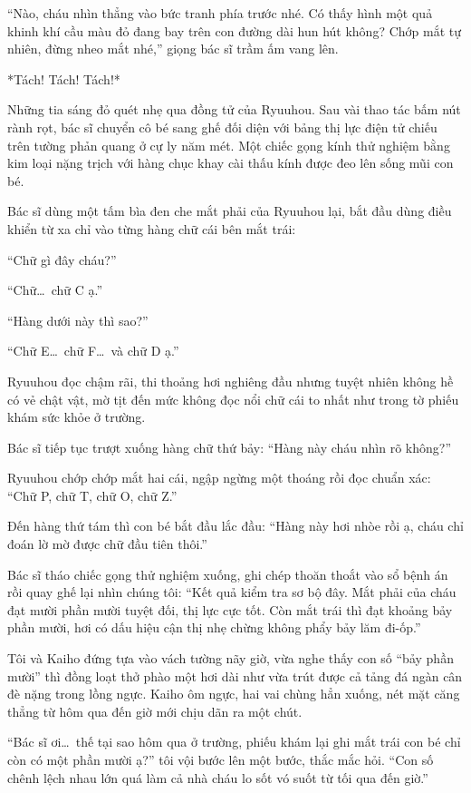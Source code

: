 ﻿\documentclass[../main.tex]{subfiles}
\begin{document}
``Nào, cháu nhìn thẳng vào bức tranh phía trước nhé. Có thấy hình một quả khinh khí cầu màu đỏ đang bay trên con đường dài hun hút không? Chớp mắt tự nhiên, đừng nheo mắt nhé,'' giọng bác sĩ trầm ấm vang lên.

*Tách! Tách! Tách!*

Những tia sáng đỏ quét nhẹ qua đồng tử của Ryuuhou. Sau vài thao tác bấm nút rành rọt, bác sĩ chuyển cô bé sang ghế đối diện với bảng thị lực điện tử chiếu trên tường phản quang ở cự ly năm mét. Một chiếc gọng kính thử nghiệm bằng kim loại nặng trịch với hàng chục khay cài thấu kính được đeo lên sống mũi con bé.

Bác sĩ dùng một tấm bìa đen che mắt phải của Ryuuhou lại, bắt đầu dùng điều khiển từ xa chỉ vào từng hàng chữ cái bên mắt trái:

``Chữ gì đây cháu?''

``Chữ\dots\ chữ C ạ.''

``Hàng dưới này thì sao?''

``Chữ E\dots\ chữ F\dots\ và chữ D ạ.''

Ryuuhou đọc chậm rãi, thi thoảng hơi nghiêng đầu nhưng tuyệt nhiên không hề có vẻ chật vật, mờ tịt đến mức không đọc nổi chữ cái to nhất như trong tờ phiếu khám sức khỏe ở trường.

Bác sĩ tiếp tục trượt xuống hàng chữ thứ bảy: ``Hàng này cháu nhìn rõ không?''

Ryuuhou chớp chớp mắt hai cái, ngập ngừng một thoáng rồi đọc chuẩn xác: ``Chữ P, chữ T, chữ O, chữ Z.''

Đến hàng thứ tám thì con bé bắt đầu lắc đầu: ``Hàng này hơi nhòe rồi ạ, cháu chỉ đoán lờ mờ được chữ đầu tiên thôi.''

Bác sĩ tháo chiếc gọng thử nghiệm xuống, ghi chép thoăn thoắt vào sổ bệnh án rồi quay ghế lại nhìn chúng tôi: ``Kết quả kiểm tra sơ bộ đây. Mắt phải của cháu đạt mười phần mười tuyệt đối, thị lực cực tốt. Còn mắt trái thì đạt khoảng bảy phần mười, hơi có dấu hiệu cận thị nhẹ chừng không phẩy bảy lăm đi-ốp.''

Tôi và Kaiho đứng tựa vào vách tường nãy giờ, vừa nghe thấy con số ``bảy phần mười'' thì đồng loạt thở phào một hơi dài như vừa trút được cả tảng đá ngàn cân đè nặng trong lồng ngực. Kaiho ôm ngực, hai vai chùng hẳn xuống, nét mặt căng thẳng từ hôm qua đến giờ mới chịu dãn ra một chút.

``Bác sĩ ơi\dots\ thế tại sao hôm qua ở trường, phiếu khám lại ghi mắt trái con bé chỉ còn có một phần mười ạ?'' tôi vội bước lên một bước, thắc mắc hỏi. ``Con số chênh lệch nhau lớn quá làm cả nhà cháu lo sốt vó suốt từ tối qua đến giờ.''
\end{document}
